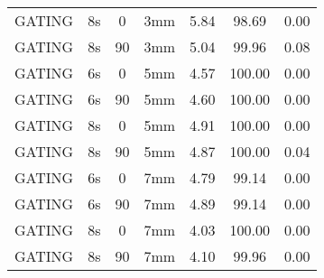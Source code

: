 \begin{table}[H]
\begin{tabular}{|c||c|c|c||c|c|c|}
GATING & 8s & 0 & 3mm & 5.84 & 98.69 & 0.00 \\
GATING & 8s & 90 & 3mm & 5.04 & 99.96 & 0.08 \\
GATING & 6s & 0 & 5mm & 4.57 & 100.00 & 0.00 \\
GATING & 6s & 90 & 5mm & 4.60 & 100.00 & 0.00 \\
GATING & 8s & 0 & 5mm & 4.91 & 100.00 & 0.00 \\
GATING & 8s & 90 & 5mm & 4.87 & 100.00 & 0.04 \\
GATING & 6s & 0 & 7mm & 4.79 & 99.14 & 0.00 \\
GATING & 6s & 90 & 7mm & 4.89 & 99.14 & 0.00 \\
GATING & 8s & 0 & 7mm & 4.03 & 100.00 & 0.00 \\
GATING & 8s & 90 & 7mm & 4.10 & 99.96 & 0.00 \\
    \hline\hline 
  \end{tabular}
\end{table}


\newpage


